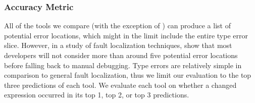 \subsubsection{Accuracy Metric}
All of the tools we compare (with the exception of \ocaml) can produce a
list of potential error locations, which might in the limit include the
entire type error slice.
%
However, in a study of fault localization techniques,
\citet{Kochhar2016-oc} show that most developers will not consider more
than around five potential error locations before falling back to manual
debugging.
%
Type errors are relatively simple in comparison to general fault
localization, thus we limit our evaluation to the top three predictions
of each tool.
%
We evaluate each tool on whether a changed expression occurred in its
top 1, top 2, or top 3 predictions.






